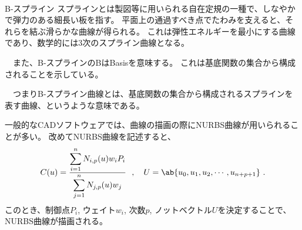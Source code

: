 ~\vfill
\begin{\Columnname}{B-スプライン}
スプラインとは製図等に用いられる自在定規の一種で、しなやかで弾力のある細長い板を指す。
平面上の通過すべき点でたわみを支えると、それらを結ぶ滑らかな曲線が得られる。
これは弾性エネルギーを最小にする曲線であり、数学的には3次のスプライン曲線となる。

　また、B-スプラインのBはBasisを意味する。
これは基底関数の集合から構成されることを示している。

　つまりB-スプライン曲線とは、基底関数の集合から構成されるスプラインを表す曲線、というような意味である。
\end{\Columnname}



\clearpage
一般的なCADソフトウェアでは、曲線の描画の際にNURBS曲線が用いられることが多い。
改めてNURBS曲線を記述すると、
\begin{align*}
  C(u) = \frac{\displaystyle\sum_{i=1}^nN_{i, p}(u)w_iP_i}{\displaystyle\sum_{j=1}^nN_{j, p}(u)w_j}~~,\quad
  U = \ab\{u_0, u_1, u_2, \cdots, u_{n+p+1}\}\ .
\end{align*}
このとき、制御点$P_i$, ウェイト$w_i$, 次数$p$, ノットベクトル$U$を決定することで、NURBS曲線が描画される。



